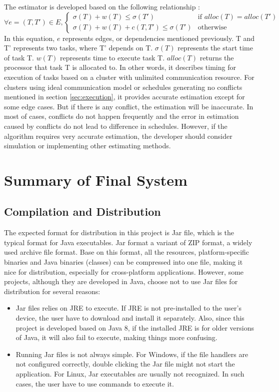 \documentclass[msc,deptreport, cs]{infthesis}
\begin{document}
The estimator is developed based on the following relationship \cite{Robert2011}:
\begin{equation*}
  \forall e = (T, T') \in E, 
  \begin{cases}
    \sigma (T) + w(T) \leq \sigma(T') & \text{if } alloc(T) = alloc(T')\\
    \sigma (T) + w(T) + c(T, T') \leq \sigma(T')              & \text{otherwise}
\end{cases}
\label{eq:task}
\end{equation*}
In this equation, $e$ represents edges, or dependencies mentioned previously. T and T' represents two tasks, where T' depends on T. $\sigma(T)$ represents the start time of task T. $w(T)$ represents time to execute task T. $alloc(T)$ returns the processor that task T is allocated to. In other words, it describes timing for execution of tasks based on a cluster with unlimited communication resource. For clusters using ideal communication model or schedules generating no conflicts mentioned in section \ref{sec:execution}, it provides accurate estimation except for some edge cases. But if there is any conflict, the estimation will be inaccurate. In most of cases, conflicts do not happen frequently and the error in estimation caused by conflicts do not lead to difference in schedules. However, if the algorithm requires very accurate estimation, the developer should consider simulation or implementing other estimating methods.

\chapter{Summary of Final System}

\section{Compilation and Distribution}

The expected format for distribution in this project is Jar file, which is the typical format for Java executables. Jar format a variant of ZIP format, a widely used archive file format. Base on this format, all the resources, platform-specific binaries and Java binaries (classes) can be compressed into one file, making it nice for distribution, especially for cross-platform applications. However, some projects, although they are developed in Java, choose not to use Jar files for distribution for several reasons:
\begin{itemize}
  \item Jar files relies on JRE to execute. If JRE is not pre-installed to the user's device, the user have to download and install it separately. Also, since this project is developed based on Java 8, if the installed JRE is for older versions of Java, it will also fail to execute, making things more confusing.
  \item Running Jar files is not always simple. For Windows, if the file handlers are not configured correctly, double clicking the Jar file might not start the application. For Linux, Jar executables are usually not recognized. In such cases, the user have to use commands to execute it.
\end{itemize}
\end{document}
